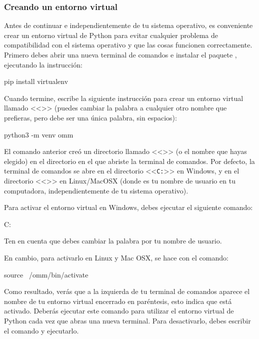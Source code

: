 \subsubsection{Creando un entorno virtual}
Antes de continuar e independientemente de tu sistema operativo, es conveniente crear un entorno virtual de Python para evitar cualquier problema de compatibilidad con el sistema operativo y que las cosas funcionen correctamente. Primero debes abrir una nueva terminal de comandos e instalar el paquete , ejecutando la instrucción:

\begin{terminal}
pip install virtualenv
\end{terminal}

 Cuando termine, escribe la siguiente instrucción para crear un entorno virtual llamado <<>> (puedes cambiar la palabra  a cualquier otro nombre que prefieras, pero debe ser una única palabra, sin espacios):

\begin{terminal}
python3 -m venv omm
\end{terminal}

El comando anterior creó un directorio llamado <<>> (o el nombre que hayas elegido) en el directorio en el que abriste la terminal de comandos. Por defecto, la terminal de comandos se abre en el directorio <<\texttt{C:\Users\user}>> en Windows, y en el directorio <<>> en Linux/MacOSX (donde  es tu nombre de usuario en tu computadora, independientemente de tu sistema operativo). 

Para activar el entorno virtual en Windows, debes ejecutar el siguiente comando:
\begin{terminal}
C:\Users\user\omm\Scripts\activate 
\end{terminal}
Ten en cuenta que debes cambiar la palabra  por tu nombre de usuario.

En cambio, para activarlo en Linux y Mac OSX, se hace con el comando:
\begin{terminal}
source ~/omm/bin/activate
\end{terminal}

Como resultado, verás que a la izquierda de tu terminal de comandos aparece el nombre de tu entorno virtual encerrado en paréntesis, esto indica que está activado. Deberás ejecutar este comando para utilizar el entorno virtual de Python cada vez que abras una nueva terminal. Para desactivarlo, debes escribir el comando  y ejecutarlo.


